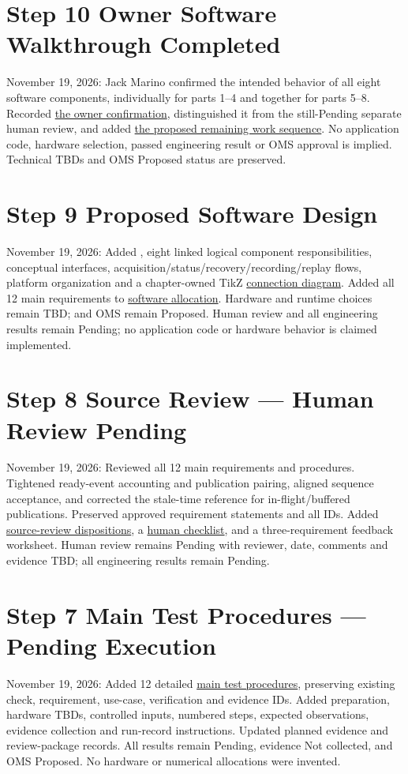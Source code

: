 \section{Step 10 Owner Software Walkthrough Completed}
November 19, 2026: Jack Marino confirmed the intended behavior of all eight software components, individually for parts 1--4 and together for parts 5--8. Recorded \hyperref[Table:OwnerSoftwareReview]{the owner confirmation}, distinguished it from the still-Pending separate human review, and added \hyperref[Section:RemainingSoftwareWork]{the proposed remaining work sequence}. No application code, hardware selection, passed engineering result or OMS approval is implied. Technical TBDs and OMS Proposed status are preserved.

\section{Step 9 Proposed Software Design}
November 19, 2026: Added , eight linked logical component responsibilities, conceptual interfaces, acquisition/status/recovery/recording/replay flows, platform organization and a chapter-owned TikZ \hyperref[Figure:SoftwareComponents]{connection diagram}. Added all 12 main requirements to \hyperref[Table:SoftwareAllocation]{software allocation}. Hardware and runtime choices remain TBD;  and OMS remain Proposed. Human review and all engineering results remain Pending; no application code or hardware behavior is claimed implemented.

\section{Step 8 Source Review --- Human Review Pending}
November 19, 2026: Reviewed all 12 main requirements and procedures. Tightened ready-event accounting and publication pairing, aligned sequence acceptance, and corrected the stale-time reference for in-flight/buffered publications. Preserved approved requirement statements and all IDs. Added \hyperref[Table:StepEightFindings]{source-review dispositions}, a \hyperref[Section:HumanReviewChecklist]{human checklist}, and a three-requirement feedback worksheet. Human review remains Pending with reviewer, date, comments and evidence TBD; all engineering results remain Pending.

\section{Step 7 Main Test Procedures --- Pending Execution}
November 19, 2026: Added 12 detailed \hyperref[Section:MainTestProcedures]{main test procedures}, preserving existing check, requirement, use-case, verification and evidence IDs. Added preparation, hardware TBDs, controlled inputs, numbered steps, expected observations, evidence collection and run-record instructions. Updated planned evidence and review-package records. All results remain Pending, evidence Not collected, and OMS Proposed. No hardware or numerical allocations were invented.

